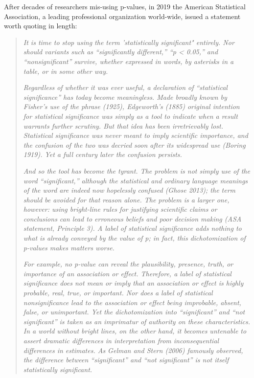 \documentclass[]{tufte-book}
\begin{document}
After decades of researchers mis-using p-values, in 2019 the American Statistical Association, a leading professional organization world-wide, issued a statement worth quoting in length:

\begin{quote}
\emph{It is time to stop using the term 'statistically significant" entirely. Nor should variants such as ``significantly different,'' ``p \textless{} 0.05,'' and ``nonsignificant'' survive, whether expressed in words, by asterisks in a table, or in some other way.}

\emph{Regardless of whether it was ever useful, a declaration of ``statistical significance'' has today become meaningless. Made broadly known by Fisher's use of the phrase (1925), Edgeworth's (1885) original intention for statistical significance was simply as a tool to indicate when a result warrants further scrutiny. But that idea has been irretrievably lost. Statistical significance was never meant to imply scientific importance, and the confusion of the two was decried soon after its widespread use (Boring 1919). Yet a full century later the confusion persists.}

\emph{And so the tool has become the tyrant. The problem is not simply use of the word ``significant,'' although the statistical and ordinary language meanings of the word are indeed now hopelessly confused (Ghose 2013); the term should be avoided for that reason alone. The problem is a larger one, however: using bright-line rules for justifying scientific claims or conclusions can lead to erroneous beliefs and poor decision making (ASA statement, Principle 3). A label of statistical significance adds nothing to what is already conveyed by the value of p; in fact, this dichotomization of p-values makes matters worse.}

\emph{For example, no p-value can reveal the plausibility, presence, truth, or importance of an association or effect. Therefore, a label of statistical significance does not mean or imply that an association or effect is highly probable, real, true, or important. Nor does a label of statistical nonsignificance lead to the association or effect being improbable, absent, false, or unimportant. Yet the dichotomization into ``significant'' and ``not significant'' is taken as an imprimatur of authority on these characteristics. In a world without bright lines, on the other hand, it becomes untenable to assert dramatic differences in interpretation from inconsequential differences in estimates. As Gelman and Stern (2006) famously observed, the difference between ``significant'' and ``not significant'' is not itself statistically significant.}


\end{quote}
\end{document}
